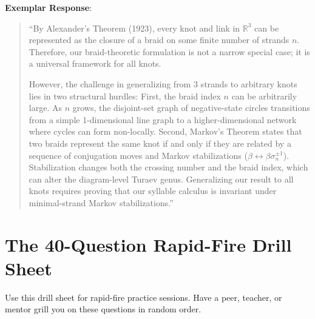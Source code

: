 \documentclass[11pt,letterpaper]{article}
\begin{document}
\begin{exemplarbox}
\textbf{Exemplar Response}:
\begin{quote}
``By Alexander's Theorem (1923), every knot and link in $\mathbb{R}^3$ can be represented as the closure of a braid on some finite number of strands $n$. Therefore, our braid-theoretic formulation is not a narrow special case; it is a universal framework for all knots.

However, the challenge in generalizing from 3 strands to arbitrary knots lies in two structural hurdles:
First, the braid index $n$ can be arbitrarily large. As $n$ grows, the disjoint-set graph of negative-state circles transitions from a simple 1-dimensional line graph to a higher-dimensional network where cycles can form non-locally.
Second, Markov's Theorem states that two braids represent the same knot if and only if they are related by a sequence of conjugation moves and Markov stabilizations ($\beta \leftrightarrow \beta \sigma_n^{\pm 1}$). Stabilization changes both the crossing number and the braid index, which can alter the diagram-level Turaev genus. Generalizing our result to all knots requires proving that our syllable calculus is invariant under minimal-strand Markov stabilizations.''
\end{quote}
\end{exemplarbox}

\newpage
\section{The 40-Question Rapid-Fire Drill Sheet}

Use this drill sheet for rapid-fire practice sessions. Have a peer, teacher, or mentor grill you on these questions in random order.
\end{document}
